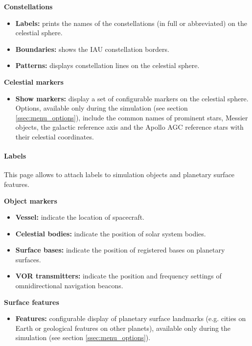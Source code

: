 \documentclass[Orbiter User Manual.tex]{subfiles}
\begin{document}
\noindent
\textbf{Constellations}
\begin{itemize}
\item \textbf{Labels:} prints the names of the constellations (in full or abbreviated) on the celestial sphere.
\item \textbf{Boundaries:} shows the IAU constellation borders.
\item \textbf{Patterns:} displays constellation lines on the celestial sphere.
\end{itemize}

\noindent
\textbf{Celestial markers}
\begin{itemize}
\item \textbf{Show markers:} display a set of configurable markers on the celestial sphere. Options, available only during the simulation (see section \ref{ssec:menu_options}), include the common names of prominent stars, Messier objects, the galactic reference axis and the Apollo AGC reference stars with their celestial coordinates.
\end{itemize}

\paragraph{Labels}
This page allows to attach labels to simulation objects and planetary surface features.

\begin{figure}[H]
	\centering
\end{figure}

\textbf{Object markers}
\begin{itemize}
\item \textbf{Vessel:} indicate the location of spacecraft.
\item \textbf{Celestial bodies:} indicate the position of solar system bodies.
\item \textbf{Surface bases:} indicate the position of registered bases on planetary surfaces.
\item \textbf{VOR transmitters:} indicate the position and frequency settings of omnidirectional navigation beacons.
\end{itemize}

\noindent
\textbf{Surface features}
\begin{itemize}
\item \textbf{Features:} configurable display of planetary surface landmarks (e.g. cities on Earth or geological features on other planets), available only during the simulation (see section \ref{ssec:menu_options}).
\end{itemize}
\end{document}
